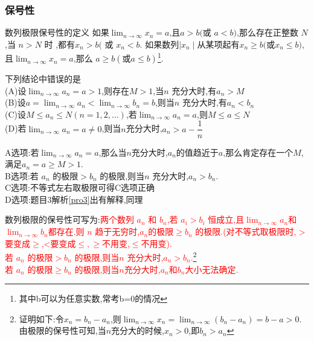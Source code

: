 \documentclass[8pt a4paper, oneside, UTF8]{ctexbook}
\begin{document}
\begin{sloppypar}
    \subsubsection{保号性}
    \begin{defn}{数列极限保号性的定义}{}
        如果$\lim_{n\to\infty}x_n=a$,且$a{>}b( $或 $a{<}b)$,那么存在正整数 $N$,当 $n{>}N$ 时 ,都有$x_n{>}b($ 或 $x_n{<}b$.\newline
        如果数列$\mid x_n\mid$从某项起有$x_n\geqslant b($或$x_n\leqslant b)$,且$\lim_{n\to\infty}x_n=a $,那么 $a\geqslant b( 或 a\leqslant b)$\footnote{其中b可以为任意实数,常考b=0的情况}.
    \end{defn}
    \begin{problem}
    下列结论中错误的是\\
    (A)设$\lim _{n\to\infty}a_n=a>1$,则存在$M>1$,当$n$ 充分大时,有$a_n>M$\\
    (B)设$a=\lim_{n\to\infty}a_n<\lim_{n\to\infty}b_n=b$,则当$n$ 充分大时,有$a_n<b_n$ \\
    (C)设$M\leqslant a_n\leqslant N(n=1,2,...)$,若$\lim_{n\to\infty} a_n=a$,则$M\leqslant a\leqslant N$ \\
    (D)若$\lim_{n\to\infty} a_n=a\neq0$,则当$n$充分大时,$a_n>a-\dfrac1n$
    \end{problem}
    \begin{solution}
        A选项:若$\lim_{n \to \infty}a_n=a$,那么当$n$充分大时,$a_n$的值趋近于$a$,那么肯定存在一个$M$,满足$a_n = a \geqslant M > 1.$\\
        B选项:若 $a_n$ 的极限$>b_n$ 的极限,则当$n$ 充分大时,$a_n>b_n$.\\
        C选项:不等式左右取极限可得C选项正确\\
        D选项:题目3解析\ref{pro3}出有解释,同理
    \end{solution}
    \begin{note}
        数列极限的保号性可写为:\textcolor{red}{两个数列 $a_n$ 和 $b_n$,若 $a_i>b_i$ 恒成立,且$\lim_{n \to \infty}a_n$和$\lim_{n\to \infty}b_n$都存在.则 $n$ 趋于无穷时,$a_n$的极限$\geqslant b_n$ 的极限.(对不等式取极限时,$>$要变成$\geqslant$,<要变成$\leqslant,\geqslant$不用变,$\leqslant$不用变).}\\
        \textcolor{red}{若 $a_n$ 的极限$>b_n$ 的极限,则当$n$ 充分大时,$a_n>b_n$.}\footnote{证明如下:令$x_n=b_n-a_n$,则$\lim_{n \to \infty}x_n=\lim_{n\to \infty}(b_n-a_n)=b-a>0$.由极限的保号性可知,当$n$充分大的时候,$x_n>0$,即$b_n>a_n$}\\
        \textcolor{red}{若 $a_n$ 的极限$\geqslant b_n$ 的极限,则当$n$充分大时,$a_n$和$b_n$大小无法确定.}
    \end{note}


\end{sloppypar}
\end{document}
